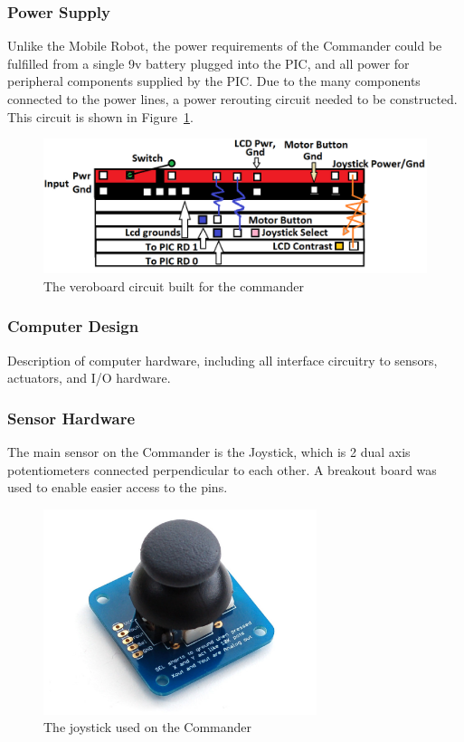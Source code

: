 \documentclass[11pt,a4paper]{article}
\begin{document}
    \subsubsection{Power Supply}
      Unlike the Mobile Robot, the power requirements of the Commander could be fulfilled from a single 9v battery plugged into the PIC, and all power for peripheral components supplied by the PIC. Due to the many components connected to the power lines, a power rerouting circuit needed to be constructed. This circuit is shown in Figure~\ref{fig:commanderVero}.
      \begin{figure}
        \includegraphics[width = 15cm]{commanderVero.png}
        \caption{The veroboard circuit built for the commander}
        \label{fig:commanderVero}
      \end{figure}
    \subsubsection{Computer Design}
      Description of computer hardware, including all interface circuitry to sensors, actuators, and I/O hardware.
    \subsubsection{Sensor Hardware}
    The main sensor on the Commander is the Joystick, which is 2 dual axis potentiometers connected perpendicular to each other. A breakout board was used to enable easier access to the pins.
    \begin{figure}[h]
      \includegraphics[width=8cm]{joystick.png}
      \caption{The joystick used on the Commander}
      \label{fig:joystick}
    \end{figure}
\end{document}
